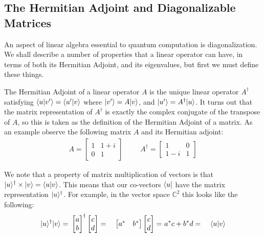 \subsection{The Hermitian Adjoint and Diagonalizable Matrices}
An aspect of linear algebra essential to quantum computation is diagonalization. We shall describe a number of properties that a linear operator can have, in terms of both its Hermitian Adjoint, and its eigenvalues, but first we must define these things.

The Hermitian Adjoint of a linear operator $A$ is the unique linear operator $A^\dagger$ satisfying $\langle u | v' \rangle = \langle u' | v \rangle$ where $| v' \rangle = A| v \rangle$, and $| u' \rangle = A^\dagger | u \rangle$. It turns out that the matrix representation of $A^\dagger$ is exactly the complex conjugate of the transpose of $A$, so this is taken as the definition of the Hermitian Adjoint of a matrix. As an example observe the following matrix $A$ and its Hermitian adjoint:
\begin{align*}
A = \left[\begin{matrix}
1 & 1+i\\
0 & 1
\end{matrix}\right]
&&&
A^\dagger = \left[\begin{matrix}
1 & 0\\
1-i & 1
\end{matrix}\right]
\end{align*}

We note that a property of matrix multiplication of vectors is that $| u \rangle^\dagger\times| v \rangle = \langle u | v \rangle$. This means that our co-vectors $\langle u |$ have the matrix representation $| u \rangle^\dagger$. For example, in the vector space $\mathbb{C}^2$ this looks like the following:
\begin{align*}
\ket{u}^\dagger\ket{v}
=&\ 
\left[\begin{matrix}
a\\
b
\end{matrix}\right]^\dagger
\left[\begin{matrix}
c\\
d
\end{matrix}\right]
=&\ 
\left[\begin{matrix}
a^*&b^*
\end{matrix}\right]
\left[\begin{matrix}
c\\
d
\end{matrix}\right]
=&\ a^*c+b^*d
=&\ \braket{u}{v}
\end{align*}

